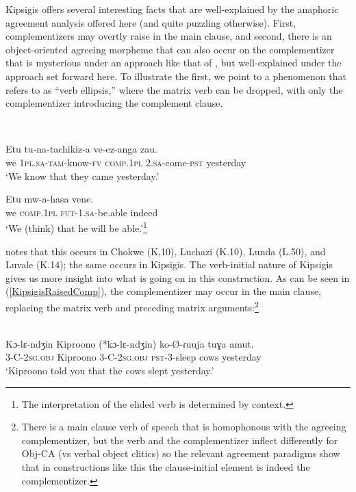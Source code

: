 \documentclass[output=paper
,modfonts
,nonflat
]{langsci/langscibook}
\begin{document}
Kipsigis offers several interesting facts that are well-explained by the anaphoric agreement analysis offered here (and quite puzzling otherwise). First, complementizers may overtly raise in the main clause, and second, there is an object-oriented agreeing morpheme that can also occur on the complementizer that is mysterious under an approach like that of \citet{Diercks:2013}, but well-explained under the approach set forward here. To illustrate the first, we point to a phenomenon that \citet{Kawasha:2007} refers to as ``verb ellipsis,'' where the matrix verb can be dropped, with only the complementizer introducing the complement clause. 

\ea
{}\\
\begin{xlist}

\ex 
\gll Etu tu-na-tachikiz-a  ve-ez-anga zau. \\
we 1\textsc{pl}.\textsc{sa}-\textsc{tam}-know-\textsc{fv} \textsc{comp}.1\textsc{pl} 2.\textsc{sa}-come-\textsc{pst} yesterday \\
\glt `We know that they came yesterday.'

\ex 
\gll Etu  mw-a-hasa vene. \\  
we \textsc{comp}.1\textsc{pl} \textsc{fut}-1.\textsc{sa}-be.able indeed\\
\glt `We (think) that he will be able.'\footnote{The interpretation of the elided verb is determined by context.}

\end{xlist}
\z 

\noindent \citet{Kawasha:2007} notes that this occurs in Chokwe (K,10), Luchazi (K.10), Lunda (L.50), and Luvale (K.14); the same occurs in Kipsigis. The verb-initial nature of Kipsigis gives us more insight into what is going on in this construction. As can be seen in (\ref{KipsigisRaisedComp}), the complementizer may occur in the main clause, replacing the matrix verb and preceding matrix arguments:\footnote{There is a main clause verb of speech that is homophonous with the agreeing complementizer, but the verb and the complementizer inflect differently for Obj-CA (vs verbal object clitics) so the relevant agreement paradigms show that in constructions like this the clause-initial element is indeed the complementizer.} 

\ea \label{KipsigisRaisedComp}
\\
\gll Kɔ-lɛ-ndʒin Kiproono (*kɔ-lɛ-ndʒin) ko-\O-ɾuuja tuɣa amut. \\
3-C-2\textsc{sg}.\textsc{obj} Kiproono 3-C-2\textsc{sg}.\textsc{obj} \textsc{pst}-3-sleep cows yesterday \\
\glt `Kiproono told you that the cows slept yesterday.'
\z
\end{document}
